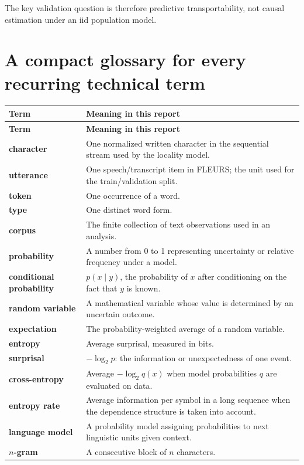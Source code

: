 \documentclass[11pt]{article}
\begin{document}
The key validation question is therefore predictive transportability, not causal estimation under an iid population model.

\newpage
\section{A compact glossary for every recurring technical term}
\begin{longtable}{p{}p{}}
\toprule
\textbf{Term} & \textbf{Meaning in this report}\\
\midrule
\endfirsthead
\toprule
\textbf{Term} & \textbf{Meaning in this report}\\
\midrule
\endhead
\textbf{character} & One normalized written character in the sequential stream used by the locality model.\\
\textbf{utterance} & One speech/transcript item in FLEURS; the unit used for the train/validation split.\\
\textbf{token} & One occurrence of a word.\\
\textbf{type} & One distinct word form.\\
\textbf{corpus} & The finite collection of text observations used in an analysis.\\
\textbf{probability} & A number from 0 to 1 representing uncertainty or relative frequency under a model.\\
\textbf{conditional probability} & $p(x\mid y)$, the probability of $x$ after conditioning on the fact that $y$ is known.\\
\textbf{random variable} & A mathematical variable whose value is determined by an uncertain outcome.\\
\textbf{expectation} & The probability-weighted average of a random variable.\\
\textbf{entropy} & Average surprisal, measured in bits.\\
\textbf{surprisal} & $-\log_2 p$: the information or unexpectedness of one event.\\
\textbf{cross-entropy} & Average $-\log_2 q(x)$ when model probabilities $q$ are evaluated on data.\\
\textbf{entropy rate} & Average information per symbol in a long sequence when the dependence structure is taken into account.\\
\textbf{language model} & A probability model assigning probabilities to next linguistic units given context.\\
\textbf{$n$-gram} & A consecutive block of $n$ characters.\\

\end{longtable}
\end{document}
